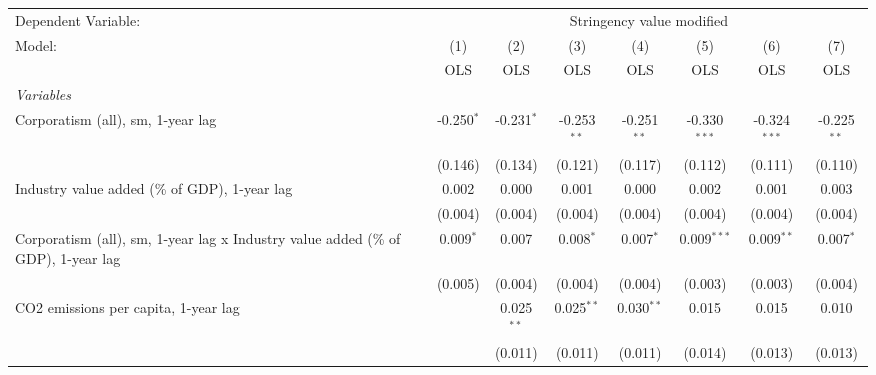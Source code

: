 
\begingroup
\centering
\begin{tabular}{lccccccc}
   \toprule
   Dependent Variable: & \multicolumn{7}{c}{Stringency value modified}\\
   Model:                                                                            & (1)          & (2)          & (3)           & (4)           & (5)            & (6)            & (7)\\  
                                                                                     &  OLS         & OLS          & OLS           & OLS           & OLS            & OLS            & OLS\\  
   \midrule
   \emph{Variables}\\
   Corporatism (all), sm, 1-year lag                                                 & -0.250$^{*}$ & -0.231$^{*}$ & -0.253$^{**}$ & -0.251$^{**}$ & -0.330$^{***}$ & -0.324$^{***}$ & -0.225$^{**}$\\   
                                                                                     & (0.146)      & (0.134)      & (0.121)       & (0.117)       & (0.112)        & (0.111)        & (0.110)\\   
   Industry value added (\% of GDP), 1-year lag                                      & 0.002        & 0.000        & 0.001         & 0.000         & 0.002          & 0.001          & 0.003\\   
                                                                                     & (0.004)      & (0.004)      & (0.004)       & (0.004)       & (0.004)        & (0.004)        & (0.004)\\   
   Corporatism (all), sm, 1-year lag x Industry value added (\% of GDP), 1-year lag  & 0.009$^{*}$  & 0.007        & 0.008$^{*}$   & 0.007$^{*}$   & 0.009$^{***}$  & 0.009$^{**}$   & 0.007$^{*}$\\   
                                                                                     & (0.005)      & (0.004)      & (0.004)       & (0.004)       & (0.003)        & (0.003)        & (0.004)\\   
   CO2 emissions per capita, 1-year lag                                              &              & 0.025$^{**}$ & 0.025$^{**}$  & 0.030$^{**}$  & 0.015          & 0.015          & 0.010\\   
                                                                                     &              & (0.011)      & (0.011)       & (0.011)       & (0.014)        & (0.013)        & (0.013)\\   

\end{tabular}
